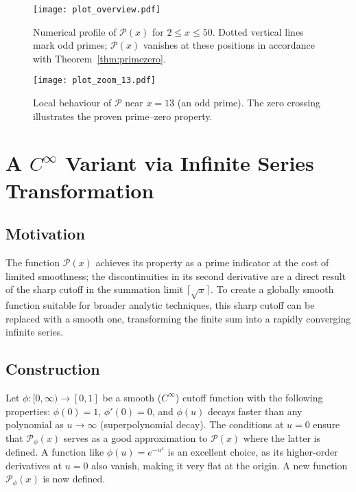 \documentclass[11pt,a4paper]{amsart}
\newcommand{\Px}{\mathcal{P}}
\theoremstyle{plain}
\theoremstyle{definition}
\begin{document}
\begin{figure}[!htbp]
\centering
\texttt{[image: plot\_overview.pdf]}
\caption{Numerical profile of $\Px(x)$ for $2\le x\le 50$. Dotted vertical lines mark odd primes; $\Px(x)$ vanishes at these positions in accordance with Theorem~\ref{thm:primezero}.}
\label{fig:overview}
\end{figure}

\begin{figure}[!htbp]
\centering
\texttt{[image: plot\_zoom\_13.pdf]}
\caption{Local behaviour of $\Px$ near $x=13$ (an odd prime). The zero crossing illustrates the proven prime–zero property.}
\label{fig:zoom13}
\end{figure}

\section{A $C^\infty$ Variant via Infinite Series Transformation}

\subsection{Motivation}
The function $\Px(x)$ achieves its property as a prime indicator at the cost of limited smoothness; the discontinuities in its second derivative are a direct result of the sharp cutoff in the summation limit $\lceil\sqrt{x}\rceil$. To create a globally smooth function suitable for broader analytic techniques, this sharp cutoff can be replaced with a smooth one, transforming the finite sum into a rapidly converging infinite series.

\subsection{Construction}
Let $\phi\colon[0, \infty) \to [0, 1]$ be a smooth ($C^\infty$) cutoff function with the following properties: $\phi(0)=1$, $\phi'(0)=0$, and $\phi(u)$ decays faster than any polynomial as $u\to\infty$ (superpolynomial decay). The conditions at $u=0$ ensure that $\Px_{\phi}(x)$ serves as a good approximation to $\Px(x)$ where the latter is defined. A function like $\phi(u) = e^{-u^4}$ is an excellent choice, as its higher-order derivatives at $u=0$ also vanish, making it very flat at the origin. A new function $\Px_{\phi}(x)$ is now defined.
\end{document}
